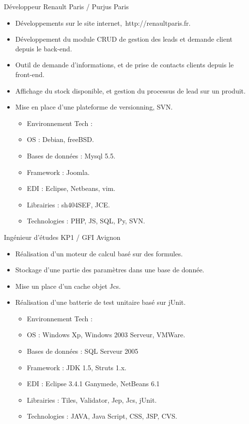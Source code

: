 \documentclass[10pt,a4paper,sans]{moderncv}
\begin{document}
 {Développeur} {Renault Paris / Purjus}
{Paris}{} {
    \begin{itemize}%
        \item Développements sur le site internet, http://renaultparis.fr.
        \item Développement du module CRUD de gestion des leads et demande client depuis le back-end.
        \item Outil de demande d'informations, et de prise de contacts clients depuis le front-end.
        \item Affichage du stock disponible, et gestion du processus de lead sur un produit.
        \item Mise en place d'une plateforme de versionning, SVN.
            \begin{itemize}%
                \item Environnement Tech :
                \item OS : Debian, freeBSD.
                \item Bases de données : Mysql 5.5.
                \item Framework : Joomla.
                \item EDI : Eclipse, Netbeans, vim.
                \item Librairies : sh404SEF, JCE.
                \item Technologies : PHP, JS, SQL, Py, SVN.
            \end{itemize}
\end{itemize}}

 {Ingénieur d'études} {KP1 / GFI}
{Avignon}{} {
    \begin{itemize}%
        \item Réalisation d'un moteur de calcul basé sur des formules.
        \item Stockage d'une partie des paramètres dans une base de donnée.
        \item Mise un place d'un cache objet Jcs.
        \item Réalisation d'une batterie de test unitaire basé sur jUnit.
            \begin{itemize}%
                \item Environnement Tech :
                \item OS : Windows Xp, Windows 2003 Serveur, VMWare.
                \item Bases de données : SQL Serveur 2005
                \item Framework : JDK 1.5,  Struts 1.x.
                \item EDI : Eclipse 3.4.1 Ganymede, NetBeans 6.1
                \item Librairies : Tiles, Validator, Jep, Jcs, jUnit.
                \item Technologies : JAVA, Java Script, CSS, JSP, CVS.
            \end{itemize}
\end{itemize}}
\end{document}
